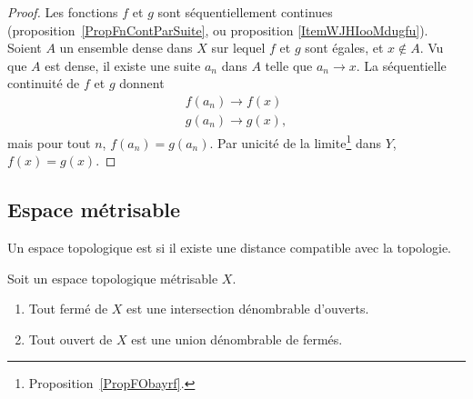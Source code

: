 \begin{proof}
    Les fonctions \( f\) et \( g\) sont séquentiellement continues (proposition~\ref{PropFnContParSuite}, ou proposition \ref{ItemWJHIooMdugfu}). Soient \( A\) un ensemble dense dans \( X\) sur lequel \( f\) et \( g\) sont égales, et \( x\notin A\). Vu que \( A\) est dense, il existe une suite \( a_n\) dans \( A\) telle que \( a_n\to x\). La séquentielle continuité de \( f\) et \( g\) donnent
    \begin{subequations}
        \begin{align}
            f(a_n)\to f(x)\\
            g(a_n)\to g(x),
        \end{align}
    \end{subequations}
    mais pour tout \( n\), \( f(a_n)=g(a_n)\). Par unicité de la limite\footnote{Proposition~\ref{PropFObayrf}.} dans \( Y\), \( f(x)=g(x)\).
\end{proof}

\subsection{Espace métrisable}

\begin{definition}
    Un espace topologique est  si il existe une distance compatible avec la topologie.
\end{definition}

\begin{proposition}      \label{PROPooXWBTooCvGLOj}
    Soit un espace topologique métrisable \( X\).
    \begin{enumerate}
        \item   \label{ITEMooOXVRooBsKwuq}
            Tout fermé de \( X\) est une intersection dénombrable d'ouverts.
        \item
            Tout ouvert de \( X\) est une union dénombrable de fermés.
    \end{enumerate}
\end{proposition}

